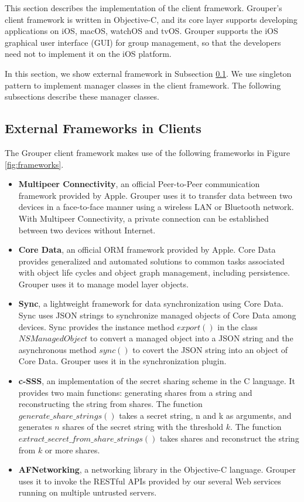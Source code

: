 \documentclass[a4paper,11pt]{report}
\begin{document}
This section describes the implementation of the client framework.
Grouper's client framework is written in Objective-C, and its core layer supports developing applications on iOS, macOS, watchOS and tvOS.
Grouper supports the iOS graphical user interface (GUI) for group management, so that the developers need not to implement it on the iOS platform.

In this section, we show external framework in Subsection \ref{subsection:dependencies_client}.
We use singleton pattern to implement manager classes in the client framework.
The following subsections describe these manager classes.

\subsection{External Frameworks in Clients} \label{subsection:dependencies_client}

The Grouper client framework makes use of the following frameworks in Figure \ref{fig:frameworks}.

\begin{itemize}[leftmargin=7mm]
	\setlength{\itemsep}{1pt}
	\setlength{\parskip}{0pt}
	\setlength{\parsep}{0pt}
	\item 
	\textbf{Multipeer Connectivity}\cite{mc}, an official Peer-to-Peer communication framework provided by Apple. 
	Grouper uses it to transfer data between two devices in a face-to-face manner using a wireless LAN or Bluetooth network.
	With Multipeer Connectivity, a private connection can be established between two devices without Internet.
	\item 
	\textbf{Core Data}\cite{coredata}, an official ORM framework provided by Apple.
	Core Data provides generalized and automated solutions to common tasks associated with object life cycles and object graph management, including persistence. 
	Grouper uses it to manage model layer objects. 
	\item 
	\textbf{Sync}\cite{sync}, a lightweight framework for data synchronization using Core Data.
	Sync uses JSON strings to synchronize managed objects of Core Data among devices.
	Sync provides the instance method $export()$ in the class $NSManagedObject$ to convert a managed object into a JSON string and the asynchronous method $sync()$ to covert the JSON string into an object of Core Data.
	Grouper uses it in the synchronization plugin.
	\item 
	\textbf{c-SSS}\cite{c-sss}, an implementation of the secret sharing scheme in the C language. 
	It provides two main functions: generating shares from a string and reconstructing the string from shares. The function $generate\_share\_strings()$ takes  a secret string, n and k as arguments, and generates $n$ shares of the secret string with the threshold $k$. The function $extract\_secret\_from\_share\_strings()$ takes shares and reconstruct the string from $k$ or more shares.
	\item 
	\textbf{AFNetworking}\cite{afnetworking}, a networking library in the Objective-C language. 
	Grouper uses it to invoke the RESTful APIs provided by our several Web services running on multiple untrusted servers. 
\end{itemize}
\end{document}

